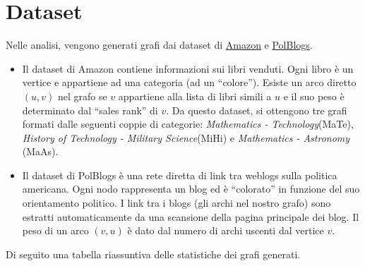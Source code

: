 \section{Dataset}
Nelle analisi, vengono generati grafi dai dataset di \href{https://snap.stanford.edu/data/amazon-meta.html}{Amazon} e \href{http://www-personal.umich.edu/~mejn/netdata/}{PolBlogs}.
\begin{itemize}
\item Il dataset di Amazon contiene informazioni sui libri venduti. Ogni libro è un vertice e 
appartiene ad una categoria (ad un ``colore''). Esiste un arco diretto $(u,v)$ nel grafo se $v$ appartiene alla lista di 
libri simili a $u$ e il suo peso è determinato dal ``sales rank'' di $v$. Da questo dataset, si ottengono tre grafi formati
dalle seguenti coppie di categorie: \emph{Mathematics - Technology}(MaTe), \emph{History of Technology - Military Science}(MiHi) e
\emph{Mathematics - Astronomy }(MaAs).  
\item Il dataset di PolBlogs è una rete diretta di link tra weblogs sulla politica americana. Ogni nodo rappresenta un blog ed è 
``colorato'' in funzione del suo orientamento politico. I link tra i blogs (gli archi nel nostro grafo) sono estratti automaticamente 
da una scansione della pagina principale dei blog. Il peso di un arco $(v,u)$ è dato dal numero di archi uscenti dal vertice $v$.
\end{itemize}
Di seguito una tabella riassuntiva delle statistiche dei grafi generati.

